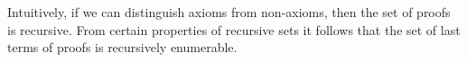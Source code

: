 

\setcounter{section}{3}
\setcounter{subsection}{5}
\setcounter{dfn}{33}

Intuitively, if we can distinguish axioms from non-axioms, then the set of proofs is recursive.
From certain properties of recursive sets it follows that the set of last terms of proofs is recursively enumerable.



